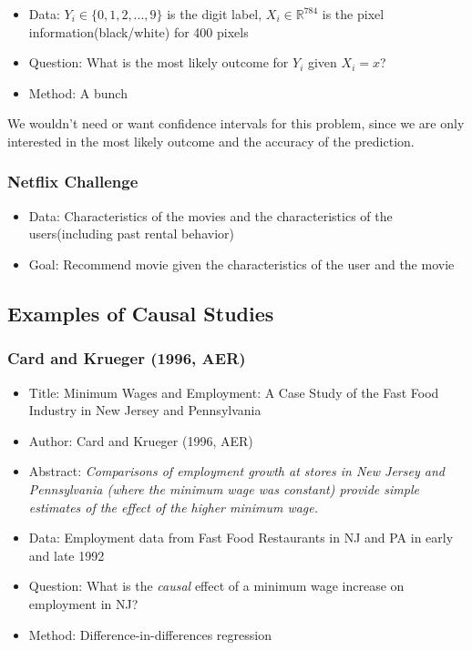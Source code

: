 \begin{itemize}
    \item Data: $Y_i \in \{0, 1, 2, ..., 9\}$ is the digit label, $X_i \in \mathbb{R}^{784}$ is the pixel information(black/white) for 400 pixels
    \item Question: What is the most likely outcome for $Y_i$ given $X_i=x$?
    \item Method: A bunch
\end{itemize}

We wouldn't need or want confidence intervals for this problem, since we are only interested in the most likely outcome and the accuracy of the prediction.

\subsubsection{Netflix Challenge}

\begin{itemize}
    \item Data: Characteristics of the movies and the characteristics of the users(including past rental behavior)
    \item Goal: Recommend movie given the characteristics of the user and the movie
\end{itemize}

\subsection{Examples of Causal Studies}

\subsubsection{Card and Krueger (1996, AER)}

\begin{itemize}
    \item Title: Minimum Wages and Employment: A Case Study of the Fast Food Industry in New Jersey and Pennsylvania
    \item Author: Card and Krueger (1996, AER)
    \item Abstract: \textit{Comparisons of employment growth at stores in New Jersey and Pennsylvania (where the minimum wage was constant) provide simple estimates of the effect of the higher minimum wage.}
    \item Data: Employment data from Fast Food Restaurants in NJ and PA in early and late 1992
    \item Question: What is the \textit{causal} effect of a minimum wage increase on employment in NJ?
    \item Method: Difference-in-differences regression
\end{itemize}



